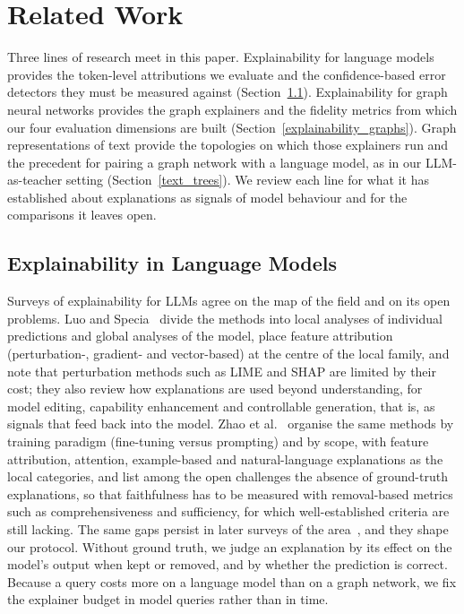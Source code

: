 \section{Related Work}

Three lines of research meet in this paper. Explainability for language models provides the token-level attributions we evaluate and the confidence-based error detectors they must be measured against (Section~\ref{explainability_lm}). Explainability for graph neural networks provides the graph explainers and the fidelity metrics from which our four evaluation dimensions are built (Section~\ref{explainability_graphs}). Graph representations of text provide the topologies on which those explainers run and the precedent for pairing a graph network with a language model, as in our LLM-as-teacher setting (Section~\ref{text_trees}). We review each line for what it has established about explanations as signals of model behaviour and for the comparisons it leaves open.

\subsection{Explainability in Language Models} \label{explainability_lm}

Surveys of explainability for LLMs agree on the map of the field and on its open problems. Luo and Specia~\cite{luo2024understandingutilizationsurveyexplainability} divide the methods into local analyses of individual predictions and global analyses of the model, place feature attribution (perturbation-, gradient- and vector-based) at the centre of the local family, and note that perturbation methods such as LIME and SHAP are limited by their cost; they also review how explanations are used beyond understanding, for model editing, capability enhancement and controllable generation, that is, as signals that feed back into the model. Zhao et al.~\cite{zhao2024surveyllm-xai} organise the same methods by training paradigm (fine-tuning versus prompting) and by scope, with feature attribution, attention, example-based and natural-language explanations as the local categories, and list among the open challenges the absence of ground-truth explanations, so that faithfulness has to be measured with removal-based metrics such as comprehensiveness and sufficiency, for which well-established criteria are still lacking. The same gaps persist in later surveys of the area~\cite{palikhe2025survey-llm-xai}, and they shape our protocol. Without ground truth, we judge an explanation by its effect on the model's output when kept or removed, and by whether the prediction is correct. Because a query costs more on a language model than on a graph network, we fix the explainer budget in model queries rather than in time.

